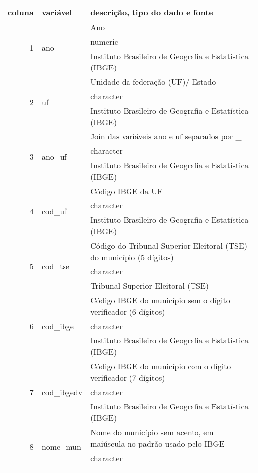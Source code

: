 \begin{longtable}{r|l|X}
\hline
coluna & variável & descrição, tipo do dado  e fonte \\
\hline
\endhead
\multirow{3}{*}{1} & \multirow{3}{*}{ano} & Ano\\*
&&  numeric  \\*
&&  Instituto Brasileiro de Geografia e Estatística (IBGE)  \\
\hline
\multirow{3}{*}{2} & \multirow{3}{*}{uf} & Unidade da federação (UF)/ Estado\\*
&&  character  \\*
&&  Instituto Brasileiro de Geografia e Estatística (IBGE)  \\
\hline
\multirow{3}{*}{3} & \multirow{3}{*}{ano\_uf} & Join das variáveis ano e uf separados por \_\\*
&&  character  \\*
&&  Instituto Brasileiro de Geografia e Estatística (IBGE)  \\
\hline
\multirow{3}{*}{4} & \multirow{3}{*}{cod\_uf} & Código IBGE da UF\\*
&&  character  \\*
&&  Instituto Brasileiro de Geografia e Estatística (IBGE)  \\
\hline
\multirow{3}{*}{5} & \multirow{3}{*}{cod\_tse} & Código do Tribunal Superior Eleitoral (TSE) do município (5 dígitos)\\*
&&  character  \\*
&&  Tribunal Superior Eleitoral (TSE)  \\
\hline
\multirow{3}{*}{6} & \multirow{3}{*}{cod\_ibge} & Código IBGE do município sem o dígito verificador (6 dígitos)\\*
&&  character  \\*
&&  Instituto Brasileiro de Geografia e Estatística (IBGE)  \\
\hline
\multirow{3}{*}{7} & \multirow{3}{*}{cod\_ibgedv} & Código IBGE do município com o dígito verificador (7 dígitos)\\*
&&  character  \\*
&&  Instituto Brasileiro de Geografia e Estatística (IBGE)  \\
\hline
\multirow{3}{*}{8} & \multirow{3}{*}{nome\_mun} & Nome do município sem acento, em maiúscula no padrão usado pelo IBGE\\*
&&  character  \\*

\end{longtable}
